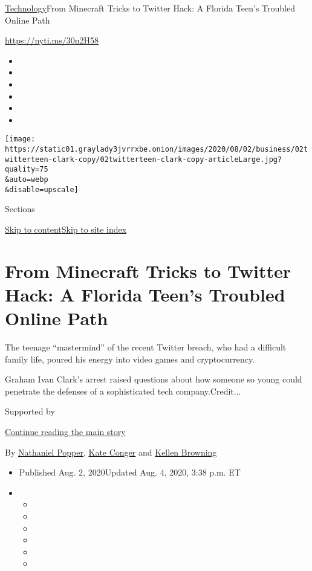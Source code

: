 \href{/section/technology}{Technology}\textbar{}From Minecraft Tricks to
Twitter Hack: A Florida Teen's Troubled Online Path

\url{https://nyti.ms/30n2H58}

\begin{itemize}
\item
\item
\item
\item
\item
\item
\end{itemize}

\texttt{[image: https://static01.graylady3jvrrxbe.onion/images/2020/08/02/business/02twitterteen-clark-copy/02twitterteen-clark-copy-articleLarge.jpg?quality=75\\\&auto=webp\\\&disable=upscale]}

Sections

\protect\hyperlink{site-content}{Skip to
content}\protect\hyperlink{site-index}{Skip to site index}

\hypertarget{from-minecraft-tricks-to-twitter-hack-a-florida-teens-troubled-online-path}{%
\section{From Minecraft Tricks to Twitter Hack: A Florida Teen's
Troubled Online
Path}\label{from-minecraft-tricks-to-twitter-hack-a-florida-teens-troubled-online-path}}

The teenage ``mastermind'' of the recent Twitter breach, who had a
difficult family life, poured his energy into video games and
cryptocurrency.

Graham Ivan Clark's arrest raised questions about how someone so young
could penetrate the defenses of a sophisticated tech company.Credit...

Supported by

\protect\hyperlink{after-sponsor}{Continue reading the main story}

By
\href{https://www.nytimes3xbfgragh.onion/by/nathaniel-popper}{Nathaniel
Popper}, \href{https://www.nytimes3xbfgragh.onion/by/kate-conger}{Kate
Conger} and
\href{https://www.nytimes3xbfgragh.onion/by/kellen-browning}{Kellen
Browning}

\begin{itemize}
\item
  Published Aug. 2, 2020Updated Aug. 4, 2020, 3:38 p.m. ET
\item
  \begin{itemize}
  \item
  \item
  \item
  \item
  \item
  \item
  \end{itemize}
\end{itemize}

